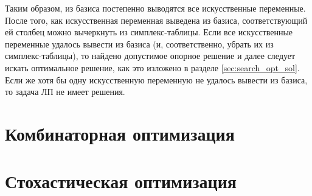 \documentclass[a4paper,12pt]{report}
\begin{document}
Таким образом, из базиса постепенно выводятся все искусственные переменные. После того, как искусственная переменная выведена из базиса, соответствующий ей столбец можно вычеркнуть из симплекс-таблицы. Если все искусственные переменные удалось вывести из базиса (и, соответственно, убрать их из симплекс-таблицы), то найдено допустимое опорное решение и далее следует искать оптимальное решение, как это изложено в разделе \ref{sec:search_opt_sol}. Если же хотя бы одну искусственную переменную не удалось вывести из базиса, то задача ЛП не имеет решения.

\clearpage

\chapter{Комбинаторная оптимизация}

\clearpage

\chapter{Стохастическая оптимизация}

\clearpage


\end{document}

